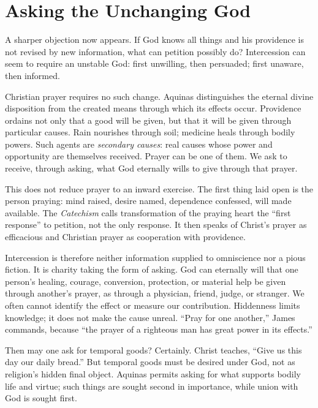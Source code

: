 \section{Asking the Unchanging God}

A sharper objection now appears. If God knows all things and his providence is not revised by new information, what can petition possibly do? Intercession can seem to require an unstable God: first unwilling, then persuaded; first unaware, then informed.

Christian prayer requires no such change. Aquinas distinguishes the eternal divine disposition from the created means through which its effects occur. Providence ordains not only that a good will be given, but that it will be given through particular causes. Rain nourishes through soil; medicine heals through bodily powers. Such agents are \emph{secondary causes}: real causes whose power and opportunity are themselves received. Prayer can be one of them. We ask to receive, through asking, what God eternally wills to give through that prayer.

This does not reduce prayer to an inward exercise. The first thing laid open is the person praying: mind raised, desire named, dependence confessed, will made available. The \emph{Catechism} calls transformation of the praying heart the ``first response'' to petition, not the only response. It then speaks of Christ's prayer as efficacious and Christian prayer as cooperation with providence.

Intercession is therefore neither information supplied to omniscience nor a pious fiction. It is charity taking the form of asking. God can eternally will that one person's healing, courage, conversion, protection, or material help be given through another's prayer, as through a physician, friend, judge, or stranger. We often cannot identify the effect or measure our contribution. Hiddenness limits knowledge; it does not make the cause unreal. ``Pray for one another,'' James commands, because ``the prayer of a righteous man has great power in its effects.''

Then may one ask for temporal goods? Certainly. Christ teaches, ``Give us this day our daily bread.'' But temporal goods must be desired under God, not as religion's hidden final object. Aquinas permits asking for what supports bodily life and virtue; such things are sought second in importance, while union with God is sought first.

